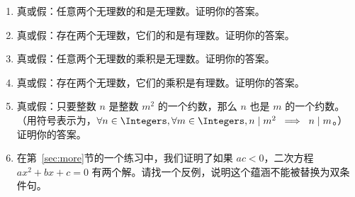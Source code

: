 \begin{enumerate}
{    \noindent 
    \noindent 如果你想在某种程度上自动化这个过程，有一个Sage函数可以返回某个范围内的所有素数列表。所以下面这个做的是同样的事情。
    
    {\tt for p in primes(2,13):}
    }
    
    \wbvfill
    
    \workbookpagebreak
    
    \item 
    真或假：任意两个无理数的和是无理数。证明你的答案。
    
    
    \wbvfill
    
    \hintspagebreak
    
    \item 
    真或假：存在两个无理数，它们的和是有理数。证明你的答案。
    
    
    \wbvfill
    
    \item 
    真或假：任意两个无理数的乘积是无理数。证明你的答案。
    
    
    \wbvfill
    
    \item 
    真或假：存在两个无理数，它们的乘积是有理数。证明你的答案。
    
    \wbvfill
    
    \workbookpagebreak
    
    \item 
    真或假：只要整数 $n$ 是整数 $m^2$ 的一个约数，那么 $n$ 也是 $m$ 的一个约数。（用符号表示为，$\forall n \in \Integers, \forall m \in \Integers, n \mid m^2 \; \implies \; n \mid m$。）证明你的答案。
    
    \wbvfill
    
    
    
    \item 
    在第~\ref{sec:more}节的一个练习中，我们证明了如果 $ac < 0$，二次方程 $ax^2 + bx + c = 0$ 有两个解。请找一个反例，说明这个蕴涵不能被替换为双条件句。
    
    \wbvfill
    
    \end{enumerate}
